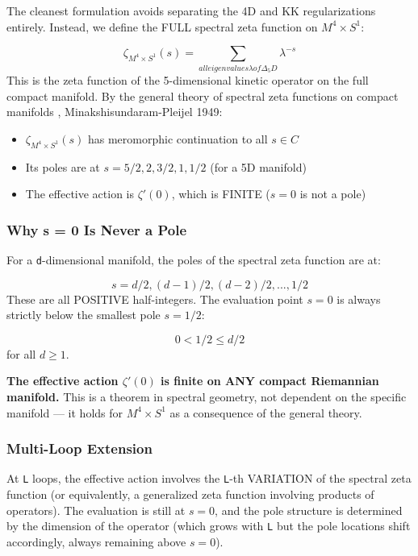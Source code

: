 \documentclass[aps,prd,preprint,superscriptaddress,longbibliography,floatfix]{revtex4-2}
\theoremstyle{remark}
\begin{document}
The cleanest formulation avoids separating the 4D and KK regularizations entirely. Instead, we define the FULL spectral zeta function on $M^{4} \times S^{1}$:


\begin{equation}
    \zeta_{M^{4} \times S^{1}}(s) = \sum_{all eigenvalues \lambda of \Delta_{5}D} \lambda^{-s}
\end{equation}
This is the zeta function of the 5-dimensional kinetic operator on the full compact manifold. By the general theory of spectral zeta functions on compact manifolds \cite{Seeley1967}, Minakshisundaram-Pleijel 1949:


\begin{itemize}
  \item $\zeta_{M^{4} \times S^{1}}(s)$ has meromorphic continuation to all $s \in C$
  \item Its poles are at $s = 5/2, 2, 3/2, 1, 1/2$ (for a 5D manifold)
  \item The effective action is $\zeta'(0)$, which is FINITE ($s = 0$ is not a pole)
\end{itemize}


\subsubsection{Why s = 0 Is Never a Pole}

For a \texttt{d}-dimensional manifold, the poles of the spectral zeta function are at:


\begin{equation}
    s = d/2, (d-1)/2, (d-2)/2, ..., 1/2
\end{equation}
These are all POSITIVE half-integers. The evaluation point $s = 0$ is always strictly below the smallest pole $s = 1/2$:


\begin{equation}
    0 < 1/2 \leq d/2
\end{equation}
for all $d \geq 1$.

\textbf{The effective action $\zeta'(0)$ is finite on ANY compact Riemannian manifold.} This is a theorem in spectral geometry, not dependent on the specific manifold --- it holds for $M^{4} \times S^{1}$ as a consequence of the general theory.


\subsubsection{Multi-Loop Extension}

At \texttt{L} loops, the effective action involves the \texttt{L}-th VARIATION of the spectral zeta function (or equivalently, a generalized zeta function involving products of operators). The evaluation is still at $s = 0$, and the pole structure is determined by the dimension of the operator (which grows with \texttt{L} but the pole locations shift accordingly, always remaining above $s = 0$).
\end{document}
